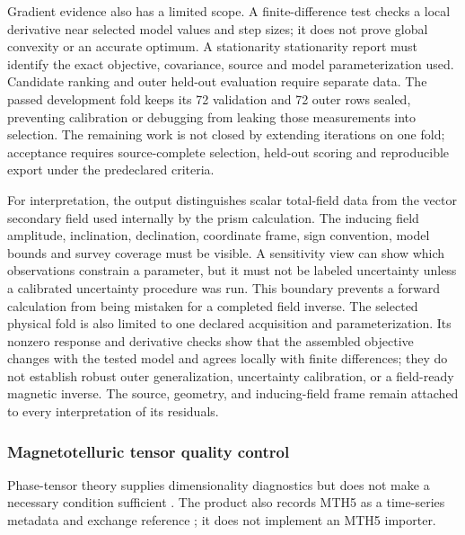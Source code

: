 Gradient evidence also has a limited scope. A finite-difference test
checks a local derivative near selected model values and step sizes; it
does not prove global convexity or an accurate optimum. A stationarity
stationarity report must identify the exact objective, covariance, source and model
parameterization used. Candidate ranking and outer held-out evaluation
require separate data. The passed development fold keeps its 72
validation and 72 outer rows sealed, preventing calibration or debugging
from leaking those measurements into selection. The remaining work is
not closed by extending iterations on one fold; acceptance requires
source-complete selection, held-out scoring and reproducible export
under the predeclared criteria.

For interpretation, the output distinguishes scalar total-field data
from the vector secondary field used internally by the prism
calculation. The inducing field amplitude, inclination, declination,
coordinate frame, sign convention, model bounds and survey coverage
must be visible. A sensitivity view can show which observations
constrain a parameter, but it must not be labeled uncertainty unless a
calibrated uncertainty procedure was run. This boundary prevents a
forward calculation from being mistaken for a completed field inverse.
The selected physical fold is also limited to one declared acquisition
and parameterization. Its nonzero response and derivative checks show
that the assembled objective changes with the tested model and agrees
locally with finite differences; they do not establish robust outer
generalization, uncertainty calibration, or a field-ready magnetic
inverse. The source, geometry, and inducing-field frame remain attached
to every interpretation of its residuals.

\subsubsection{Magnetotelluric tensor quality control}

Phase-tensor theory supplies dimensionality diagnostics but does not make a necessary condition sufficient \cite{caldwell2004}. The product also records MTH5 as a time-series metadata and exchange reference \cite{peacock2022}; it does not implement an MTH5 importer.\label{method-mt-qc}

